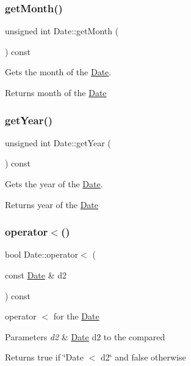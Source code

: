 \subsubsection{\texorpdfstring{get\+Month()}{getMonth()}}
{\footnotesize\ttfamily unsigned int Date\+::get\+Month (\begin{DoxyParamCaption}{ }\end{DoxyParamCaption}) const}



Gets the month of the \hyperlink{class_date}{Date}. 

\begin{DoxyReturn}{Returns}
month of the \hyperlink{class_date}{Date} 
\end{DoxyReturn}
\mbox{\label{class_date_a597b505c264a24d34369c43119fc4e6e}} 
\subsubsection{\texorpdfstring{get\+Year()}{getYear()}}
{\footnotesize\ttfamily unsigned int Date\+::get\+Year (\begin{DoxyParamCaption}{ }\end{DoxyParamCaption}) const}



Gets the year of the \hyperlink{class_date}{Date}. 

\begin{DoxyReturn}{Returns}
year of the \hyperlink{class_date}{Date} 
\end{DoxyReturn}
\mbox{\label{class_date_a09704874041e417655bf7be43596da80}} 
\subsubsection{\texorpdfstring{operator$<$()}{operator<()}}
{\footnotesize\ttfamily bool Date\+::operator$<$ (\begin{DoxyParamCaption}\item[{const \hyperlink{class_date}{Date} \&}]{d2 }\end{DoxyParamCaption}) const}



operator $<$ for the \hyperlink{class_date}{Date} 


\begin{DoxyParams}{Parameters}
{\em d2} & \hyperlink{class_date}{Date} d2 to the compared\\
\hline
\end{DoxyParams}
\begin{DoxyReturn}{Returns}
true if \char`\"{}\+Date $<$ d2\char`\"{} and false otherwise 
\end{DoxyReturn}
\mbox{\label{class_date_ab33fabb71e001e3bb98aa3aff846ea65}} 
